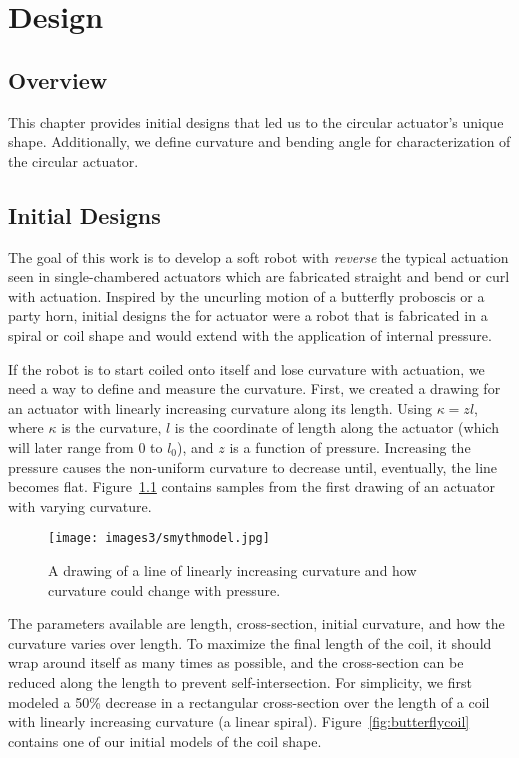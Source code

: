 \chapter{Design}

\section{Overview}
This chapter provides initial designs that led us to the circular actuator's unique shape. Additionally, we define curvature and bending angle for characterization of the circular actuator. 

\section{Initial Designs}

The goal of this work is to develop a soft robot with \emph{reverse} the typical actuation seen in single-chambered actuators which are fabricated straight and bend or curl with actuation. Inspired by the uncurling motion of a butterfly proboscis or a party horn, initial designs the for actuator were a robot that is fabricated in a spiral or coil shape and would extend with the application of internal pressure. 

If the robot is to start coiled onto itself and lose curvature with actuation, we need a way to define and measure the curvature. First, we created a drawing for an actuator with linearly increasing curvature along its length. Using $\kappa = zl$, where $\kappa$ is the curvature, $l$ is the coordinate of length along the actuator (which will later range from 0 to $l_0$), and $z$ is a function of pressure. Increasing the pressure causes the non-uniform curvature to decrease until, eventually, the line becomes flat. Figure~\ref{fig:smythmodel} contains samples from the first drawing of an actuator with varying curvature. 

\begin{figure}[ht]
    \centering
    \texttt{[image: images3/smythmodel.jpg]}
    \caption{A drawing of a line of linearly increasing curvature and how curvature could change with pressure.}
    \label{fig:smythmodel}
\end{figure}

The parameters available are length, cross-section, initial curvature, and how the curvature varies over length. To maximize the final length of the coil, it should wrap around itself as many times as possible, and the cross-section can be reduced along the length to prevent self-intersection. For simplicity, we first modeled a 50\% decrease in a rectangular cross-section over the length of a coil with linearly increasing curvature (a linear spiral). Figure~\ref{fig:butterflycoil} contains one of our initial models of the coil shape. 

